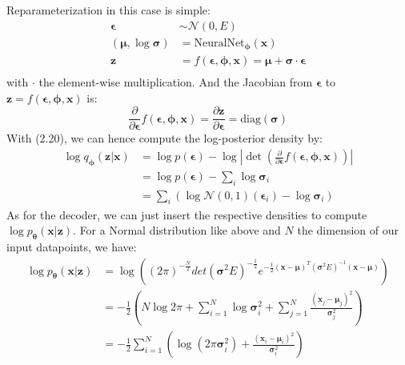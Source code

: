 \documentclass[12pt]{report}
\theoremstyle{definition}
\begin{document}
Reparameterization in this case is simple:
\begin{equation}
\begin{split}
\pmb{\epsilon} & \sim \mathcal{N}(0, E) \\
(\pmb{\mu}, \log \pmb{\sigma}) & = \mathrm{NeuralNet}_{\pmb{\phi}}(\mathbf{x}) \\
\mathbf{z} & = f(\pmb{\epsilon}, \pmb{\phi}, \pmb{x}) = \pmb{\mu} + \pmb{\sigma} \cdot \pmb{\epsilon}\\
\end{split}
\end{equation}
with $\cdot$ the element-wise multiplication. And the Jacobian from $\pmb{\epsilon}$ to $\mathbf{z} = f(\pmb{\epsilon}, \pmb{\phi}, \pmb{x})$ is:
\begin{equation}
\frac{\partial}{\partial \pmb{\epsilon}}f(\pmb{\epsilon}, \pmb{\phi}, \mathbf{x}) = \frac{\partial \mathbf{z}}{\partial \pmb{\epsilon}} = \mathrm{diag}(\pmb{\sigma})
\end{equation}
With (2.20), we can hence compute the log-posterior density by:
\begin{equation}
\begin{split}
\log q_{\pmb{\phi}}(\mathbf{z}|\mathbf{x}) & = \log p(\pmb{\epsilon}) - \log \left|\det \left(\frac{\partial}{\partial \pmb{\epsilon}}f(\pmb{\epsilon}, \pmb{\phi}, \mathbf{x})\right)\right| \\
& = \log p(\pmb{\epsilon}) - \sum_i \log \pmb{\sigma}_i \\
& = \sum_i \left(\log \mathcal{N}(0, 1)(\pmb{\epsilon}_i) - \log \pmb{\sigma}_i \right)
\end{split}
\end{equation}
As for the decoder, we can just insert the respective densities to compute $\log p_{\pmb{\theta}}(\mathbf{x}|\mathbf{z})$. For a Normal distribution like above and $N$ the dimension of our input datapoints, we have:
\begin{equation}
\begin{split}
\log p_{\pmb{\theta}}(\mathbf{x}|\mathbf{z})
& = \log \left( (2\pi)^{-\frac{N}{2}}det(\pmb{\sigma}^2 E)^{-\frac{1}{2}} e^{-\frac{1}{2}(\mathbf{x}-\pmb{\mu})^T(\pmb{\sigma}^2 E)^{-1}(\mathbf{x}-\pmb{\mu})}\right) \\
& = - \frac{1}{2} \left( N \log2\pi + \sum_{i=1}^N \log\pmb{\sigma}_i^2 + \sum_{j=1}^N \frac{(\mathbf{x}_j - \pmb{\mu}_j)^2}{\pmb{\sigma}_j^2} \right) \\
& = - \frac{1}{2} \sum_{i=1}^N \left(\log(2\pi\pmb{\sigma}_i^2) + \frac{(\mathbf{x}_i - \pmb{\mu}_i)^2}{\pmb{\sigma}_i^2} \right) \\
\end{split}
\end{equation}
\end{document}
